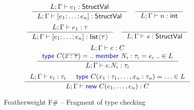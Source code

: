 \documentclass[10pt,preprint,blind,clearpagebib]{sigplanconf}
\newcommand{\langl}{\begin{picture}(4.5,7)
\put(1.1,2.5){\rotatebox{60}{\line(1,0){5.5}}}
\put(1.1,2.5){\rotatebox{300}{\line(1,0){5.5}}}
\end{picture}}
\newcommand{\rangl}{\begin{picture}(4.5,7)
\put(.9,2.5){\rotatebox{120}{\line(1,0){5.5}}}
\put(.9,2.5){\rotatebox{240}{\line(1,0){5.5}}}
\end{picture}}
\newcommand{\kvd}[1]{\textnormal{\textcolor{kvdclr}{\sffamily #1}}}
\newcommand{\ident}[1]{\textnormal{\sffamily #1}}
\begin{document}
\begin{figure}
\noindent  
\begin{equation*}
\inference
  {L; \Gamma \vdash e_1 : \ident{StructVal}}
  {L; \Gamma \vdash [e_1; \ldots; e_n]:\ident{StructVal}}
\quad  
\inference
  {~}
  {L; \Gamma \vdash n : \ident{int}}
\end{equation*}
\begin{equation*}
\inference
  {L; \Gamma \vdash e_1 : \tau}
  {L; \Gamma \vdash [e_1; \ldots; e_n]:\ident{list}\langl\tau\rangl}
\quad
\inference
  {~}
  {L; \Gamma \vdash s : \ident{StructVal}}
\end{equation*}
\vspace{0.5em}
\begin{equation*}
\inference
  {L; \Gamma \vdash e : C \\ \kvd{type}~C(\overline{x:\tau}) = ..\;\kvd{member}~N_i : \tau_i = e_i\;.. \in L}
  {L; \Gamma \vdash e.N_i:\tau_i}
\end{equation*}
\vspace{0.25em}
\begin{equation*}
\inference
  {L; \Gamma \vdash e_i : \tau_i & \kvd{type}~C(x_1:\tau_1, \ldots, x_n:\tau_n) = \ldots \in L}
  {L; \Gamma \vdash \kvd{new}~C(e_1, \ldots, e_n):C}
\end{equation*}

\caption{Featherweight F\# -- Fragment of type checking}
\label{fig:ff-typecheck}
\end{figure}

\end{document}
